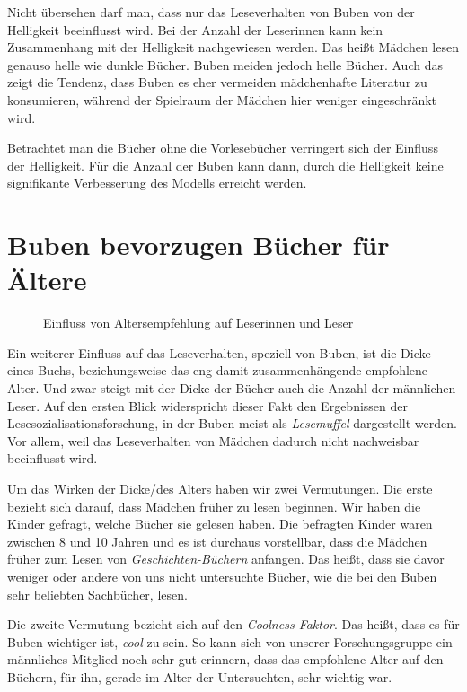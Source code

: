 Nicht übersehen darf man, dass nur das Leseverhalten von Buben von der
Helligkeit beeinflusst wird. Bei der Anzahl der Leserinnen kann kein
Zusammenhang mit der Helligkeit nachgewiesen werden. Das heißt Mädchen
lesen genauso helle wie dunkle Bücher. Buben meiden jedoch helle Bücher.
Auch das zeigt die Tendenz, dass Buben es eher vermeiden mädchenhafte
Literatur zu konsumieren, während der Spielraum der Mädchen hier weniger
eingeschränkt wird.

Betrachtet man die Bücher ohne die Vorlesebücher verringert sich der
Einfluss der Helligkeit. Für die Anzahl der Buben kann dann, durch die
Helligkeit keine signifikante Verbesserung des Modells erreicht werden.

\section{Buben bevorzugen Bücher für Ältere}

\begin{figure}
\center
  \label{alter}
  \small

  \caption[Einfluss von Altersempfehlung]{Einfluss von Altersempfehlung auf Leserinnen und Leser}
\end{figure}

Ein weiterer Einfluss auf das Leseverhalten, speziell von Buben, ist die
Dicke eines Buchs, beziehungsweise das eng damit zusammenhängende
empfohlene Alter. Und zwar steigt mit der Dicke der Bücher auch die
Anzahl der männlichen Leser. Auf den ersten Blick widerspricht dieser
Fakt den Ergebnissen der Lesesozialisationsforschung, in der Buben meist
als \emph{Lesemuffel} dargestellt werden. Vor allem, weil das
Leseverhalten von Mädchen dadurch nicht nachweisbar beeinflusst wird.

Um das Wirken der Dicke/des Alters haben wir zwei Vermutungen. Die erste
bezieht sich darauf, dass Mädchen früher zu lesen beginnen. Wir haben
die Kinder gefragt, welche Bücher sie gelesen haben. Die befragten
Kinder waren zwischen 8 und 10 Jahren und es ist durchaus vorstellbar,
dass die Mädchen früher zum Lesen von \emph{Geschichten-Büchern}
anfangen. Das heißt, dass sie davor weniger oder andere von uns nicht
untersuchte Bücher, wie die bei den Buben sehr beliebten Sachbücher,
lesen.

Die zweite Vermutung bezieht sich auf den \emph{Coolness-Faktor}. Das
heißt, dass es für Buben wichtiger ist, \emph{cool} zu sein. So kann
sich von unserer Forschungsgruppe ein männliches Mitglied noch sehr gut
erinnern, dass das empfohlene Alter auf den Büchern, für ihn, gerade im
Alter der Untersuchten, sehr wichtig war.

